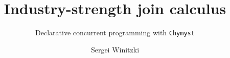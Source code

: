 \documentclass[sigplan,10pt,review,anonymous]{acmart}\settopmatter{printfolios=true}
\begin{document}
\title[Industry-strength join calculus]{Industry-strength join calculus}         %
\subtitle{Declarative concurrent programming with \texttt{Chymyst}}                     %



\author{Sergei Winitzki}


\end{document}
